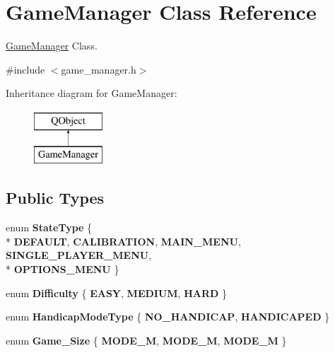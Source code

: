 \hypertarget{class_game_manager}{\section{Game\-Manager Class Reference}
\label{class_game_manager}
}


\hyperlink{class_game_manager}{Game\-Manager} Class.  




{\ttfamily \#include $<$game\-\_\-manager.\-h$>$}

Inheritance diagram for Game\-Manager\-:\begin{figure}[H]
\begin{center}
\leavevmode
\includegraphics[height=2.000000cm]{class_game_manager}
\end{center}
\end{figure}
\subsection*{Public Types}
\begin{DoxyCompactItemize}
\item 
enum {\bfseries State\-Type} \{ \\*
{\bfseries D\-E\-F\-A\-U\-L\-T}, 
{\bfseries C\-A\-L\-I\-B\-R\-A\-T\-I\-O\-N}, 
{\bfseries M\-A\-I\-N\-\_\-\-M\-E\-N\-U}, 
{\bfseries S\-I\-N\-G\-L\-E\-\_\-\-P\-L\-A\-Y\-E\-R\-\_\-\-M\-E\-N\-U}, 
\\*
{\bfseries O\-P\-T\-I\-O\-N\-S\-\_\-\-M\-E\-N\-U}
 \}
\item 
enum {\bfseries Difficulty} \{ {\bfseries E\-A\-S\-Y}, 
{\bfseries M\-E\-D\-I\-U\-M}, 
{\bfseries H\-A\-R\-D}
 \}
\item 
enum {\bfseries Handicap\-Mode\-Type} \{ {\bfseries N\-O\-\_\-\-H\-A\-N\-D\-I\-C\-A\-P}, 
{\bfseries H\-A\-N\-D\-I\-C\-A\-P\-E\-D}
 \}
\item 
enum {\bfseries Game\-\_\-\-Size} \{ {\bfseries M\-O\-D\-E\-\_\-M}, 
{\bfseries M\-O\-D\-E\-\_\-M}, 
{\bfseries M\-O\-D\-E\-\_\-M}
 \}
\end{DoxyCompactItemize}
